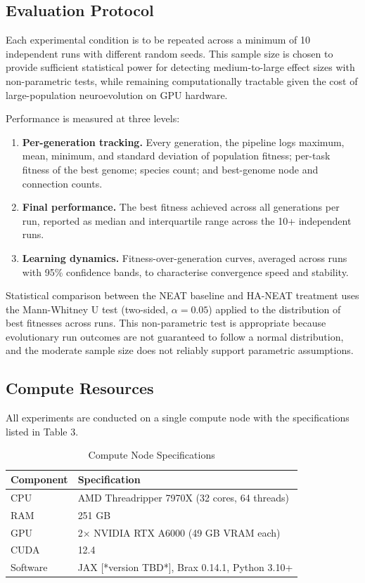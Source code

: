 \documentclass[12pt]{article}
\begin{document}
\subsection{Evaluation Protocol}

Each experimental condition is to be repeated across a minimum of 10 independent runs with different random seeds. This sample size is chosen to provide sufficient statistical power for detecting medium-to-large effect sizes with non-parametric tests, while remaining computationally tractable given the cost of large-population neuroevolution on GPU hardware.

Performance is measured at three levels:

\begin{enumerate}
    \item \textbf{Per-generation tracking.} Every generation, the pipeline logs maximum, mean, minimum, and standard deviation of population fitness; per-task fitness of the best genome; species count; and best-genome node and connection counts.
    \item \textbf{Final performance.} The best fitness achieved across all generations per run, reported as median and interquartile range across the 10+ independent runs.
    \item \textbf{Learning dynamics.} Fitness-over-generation curves, averaged across runs with 95\% confidence bands, to characterise convergence speed and stability.
\end{enumerate}

Statistical comparison between the NEAT baseline and HA-NEAT treatment uses the Mann-Whitney U test (two-sided, $\alpha = 0.05$) applied to the distribution of best fitnesses across runs. This non-parametric test is appropriate because evolutionary run outcomes are not guaranteed to follow a normal distribution, and the moderate sample size does not reliably support parametric assumptions.

\subsection{Compute Resources}

All experiments are conducted on a single compute node with the specifications listed in Table 3.

\begin{table}[h]
\centering
\caption{Compute Node Specifications}
\begin{tabular}{|l|l|}
\hline
\textbf{Component} & \textbf{Specification} \\
\hline
CPU & AMD Threadripper 7970X (32 cores, 64 threads) \\
\hline
RAM & 251 GB \\
\hline
GPU & 2$\times$ NVIDIA RTX A6000 (49 GB VRAM each) \\
\hline
CUDA & 12.4 \\
\hline
Software & JAX [*version TBD*], Brax 0.14.1, Python 3.10+ \\
\hline
\end{tabular}
\end{table}
\end{document}

